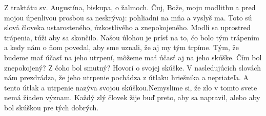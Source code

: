 Z traktátu sv. Augustína, biskupa, o žalmoch.
Čuj, Bože, moju modlitbu
a pred mojou úpenlivou prosbou sa neskrývaj:
pohliadni na mňa a vyslyš ma.
Toto sú slová človeka ustarosteného, úzkostlivého a znepokojeného.
Modlí sa uprostred trápenia, túži aby sa skončilo.
Našou úlohou je prísť na to, čo bolo tým trápením a kedy nám o ňom povedal, aby sme uznali, že aj my tým trpíme.
Tým, že budeme mať účasť na jeho utrpení, môžeme mať účasť aj na jeho skúške.
Čím bol znepokojený? Z čoho bol smutný? Hovorí o svojej skúške.
V nasledujúcich slovách nám prezdrádza, že jeho utrpenie pochádza z útlaku hriešnika a nepriateľa. A tento útlak a utrpenie nazýva svojou skúškou.Nemyslime si, že zlo v tomto svete nemá žiaden význam. Každý zlý človek žije buď preto, aby sa napravil, alebo aby bol skúškou pre tých dobrých. 